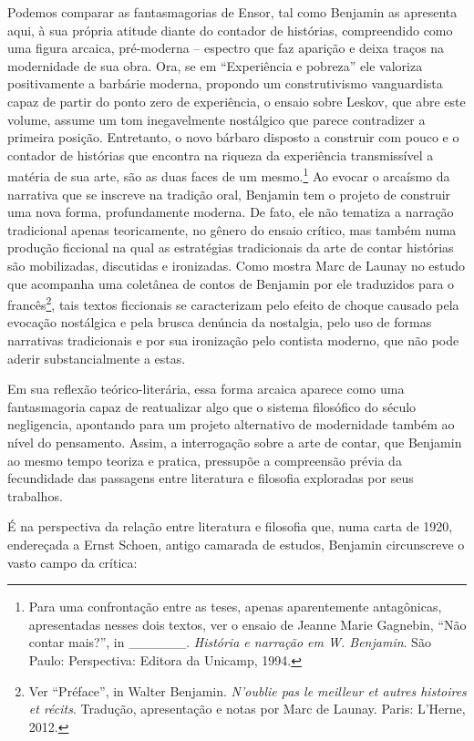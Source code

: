 Podemos comparar as fantasmagorias de Ensor, tal como Benjamin as
apresenta aqui, à sua própria atitude diante do contador de histórias,
compreendido como uma figura arcaica, pré-moderna -- espectro que faz
aparição e deixa traços na modernidade de sua obra. Ora, se em
``Experiência e pobreza'' ele valoriza positivamente a barbárie
moderna, propondo um construtivismo vanguardista capaz de partir do
ponto zero de experiência, o ensaio sobre Leskov, que abre este volume,
assume um tom inegavelmente nostálgico que parece contradizer a primeira
posição. Entretanto, o novo bárbaro disposto a construir com pouco e o
contador de histórias que encontra na riqueza da experiência
transmissível a matéria de sua arte, são as duas faces de um
mesmo.\footnote{Para uma confrontação entre as teses, apenas
  aparentemente antagônicas, apresentadas nesses dois textos, ver o
  ensaio de Jeanne Marie Gagnebin, ``Não contar mais?'', in
  \_\_\_\_\_\_. \emph{História e narração em W. Benjamin}. São Paulo:
  Perspectiva: Editora da Unicamp, 1994.} Ao evocar o arcaísmo da
narrativa que se inscreve na tradição oral, Benjamin tem o projeto de
construir uma nova forma, profundamente moderna. De fato, ele não
tematiza a narração tradicional apenas teoricamente, no gênero do ensaio
crítico, mas também numa produção ficcional na qual as estratégias
tradicionais da arte de contar histórias são mobilizadas, discutidas e
ironizadas. Como mostra Marc de Launay no estudo que acompanha uma
coletânea de contos de Benjamin por ele traduzidos para o
francês\footnote{Ver ``Préface'', in Walter Benjamin. \emph{N'oublie pas
  le meilleur et autres histoires et récits}. Tradução, apresentação e
  notas por Marc de Launay. Paris: L'Herne, 2012.}, tais textos
ficcionais se caracterizam pelo efeito de choque causado pela evocação
nostálgica e pela brusca denúncia da nostalgia, pelo uso de formas
narrativas tradicionais e por sua ironização pelo contista moderno, que
não pode aderir substancialmente a estas.

Em sua reflexão teórico-literária, essa forma arcaica aparece como uma
fantasmagoria capaz de reatualizar algo que o sistema filosófico do
século~ negligencia, apontando para um projeto alternativo de
modernidade também ao nível do pensamento. Assim, a interrogação sobre a
arte de contar, que Benjamin ao mesmo tempo teoriza e pratica, pressupõe
a compreensão prévia da fecundidade das passagens entre literatura e
filosofia exploradas por seus trabalhos.

É na perspectiva da relação entre literatura e filosofia que, numa carta
de 1920, endereçada a Ernst Schoen, antigo camarada de estudos, Benjamin
circunscreve o vasto campo da crítica:

